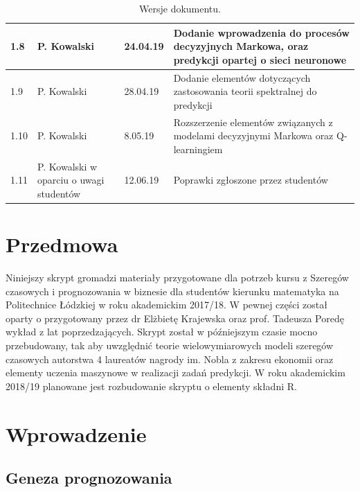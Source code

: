\documentclass[10pt,a4paper]{book}
\begin{document}
\begin{table}[h]
\begin{tabular}{|p{1cm}|p{2cm}|p{12mm}|p{12cm}|}
1.8 & P. Kowalski & 24.04.19 & Dodanie wprowadzenia do procesów decyzyjnych Markowa, oraz predykcji opartej o sieci neuronowe \\\hline
1.9 & P. Kowalski & 28.04.19 & Dodanie elementów dotyczących zastosowania teorii spektralnej do predykcji \\\hline
1.10 & P. Kowalski & 8.05.19 & Rozszerzenie elementów związanych z modelami decyzyjnymi Markowa oraz Q-learningiem \\\hline
1.11 & P. Kowalski w oparciu o uwagi studentów & 12.06.19 & Poprawki zgłoszone przez studentów
\end{tabular}
\caption{Wersje dokumentu.}
\end{table}
\FloatBarrier

\chapter*{Przedmowa}

Niniejszy skrypt gromadzi materiały przygotowane dla potrzeb kursu z Szeregów czasowych i prognozowania w biznesie dla studentów kierunku matematyka na Politechnice Łódzkiej w roku akademickim 2017/18. W pewnej części został oparty o przygotowany przez dr Elżbietę Krajewska oraz prof. Tadeusza Poredę wykład z lat poprzedzających. Skrypt został w późniejszym czasie mocno przebudowany, tak aby uwzględnić teorie wielowymiarowych modeli szeregów czasowych autorstwa 4 laureatów nagrody im. Nobla z zakresu ekonomii oraz elementy uczenia maszynowe w realizacji zadań predykcji. W roku akademickim 2018/19 planowane jest rozbudowanie skryptu o elementy składni R. 

\newpage
\tableofcontents

\chapter{Wprowadzenie}

\section{Geneza prognozowania}
\end{document}
